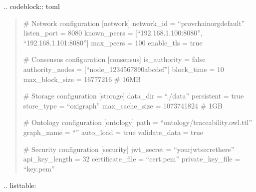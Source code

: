 \documentclass[letterpaper,10pt,english]{sphinxmanual}
\begin{document}
\sphinxAtStartPar
{}
.. code\sphinxhyphen{}block:: toml
\begin{quote}

\sphinxAtStartPar
\# Network configuration
{[}network{]}
network\_id = “provchain\sphinxhyphen{}org\sphinxhyphen{}default”
listen\_port = 8080
known\_peers = {[}“192.168.1.100:8080”, “192.168.1.101:8080”{]}
max\_peers = 100
enable\_tls = true

\sphinxAtStartPar
\# Consensus configuration
{[}consensus{]}
is\_authority = false
authority\_nodes = {[}“node\_1234567890abcdef”{]}
block\_time = 10
max\_block\_size = 16777216  \# 16MB

\sphinxAtStartPar
\# Storage configuration
{[}storage{]}
data\_dir = “./data”
persistent = true
store\_type = “oxigraph”
max\_cache\_size = 1073741824  \# 1GB

\sphinxAtStartPar
\# Ontology configuration
{[}ontology{]}
path = “ontology/traceability.owl.ttl”
graph\_name = “”
auto\_load = true
validate\_data = true

\sphinxAtStartPar
\# Security configuration
{[}security{]}
jwt\_secret = “your\sphinxhyphen{}jwt\sphinxhyphen{}secret\sphinxhyphen{}here”
api\_key\_length = 32
certificate\_file = “cert.pem”
private\_key\_file = “key.pem”
\end{quote}

\sphinxAtStartPar
{}
.. list\sphinxhyphen{}table:

\begin{sphinxVerbatim}[commandchars=\\\{\}]
 
   

  
   
   
  
     
   
  
     
   
  
     
   
  
     
   
  
     
   
\end{sphinxVerbatim}
\end{document}
